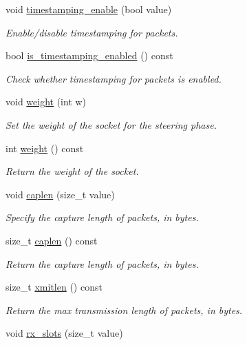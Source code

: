 \begin{DoxyCompactItemize}
void \hyperlink{classpfq_1_1socket_a39457556d11f22b1266abc8f9f7c46bd}{timestamping\+\_\+enable} (bool value)
\begin{DoxyCompactList}\small\item\em Enable/disable timestamping for packets. \end{DoxyCompactList}\item 
bool \hyperlink{classpfq_1_1socket_acb406c77d80eddec6acce34b934a8309}{is\+\_\+timestamping\+\_\+enabled} () const
\begin{DoxyCompactList}\small\item\em Check whether timestamping for packets is enabled. \end{DoxyCompactList}\item 
void \hyperlink{classpfq_1_1socket_ad843f3354b92083f01be9b5055f211b8}{weight} (int w)
\begin{DoxyCompactList}\small\item\em Set the weight of the socket for the steering phase. \end{DoxyCompactList}\item 
int \hyperlink{classpfq_1_1socket_a8c596af298aaae176a64647ba04f51ff}{weight} () const
\begin{DoxyCompactList}\small\item\em Return the weight of the socket. \end{DoxyCompactList}\item 
void \hyperlink{classpfq_1_1socket_ab68dbba5ef01041b9c96758c4a9f0a6c}{caplen} (size\+\_\+t value)
\begin{DoxyCompactList}\small\item\em Specify the capture length of packets, in bytes. \end{DoxyCompactList}\item 
size\+\_\+t \hyperlink{classpfq_1_1socket_aa0052a8337748212d02fadb229d71108}{caplen} () const
\begin{DoxyCompactList}\small\item\em Return the capture length of packets, in bytes. \end{DoxyCompactList}\item 
size\+\_\+t \hyperlink{classpfq_1_1socket_a142d9760fcef01b426c3afb4005400d9}{xmitlen} () const
\begin{DoxyCompactList}\small\item\em Return the max transmission length of packets, in bytes. \end{DoxyCompactList}\item 
void \hyperlink{classpfq_1_1socket_a5cf700fc12d67b91df3d669ac4aa737a}{rx\+\_\+slots} (size\+\_\+t value)

\end{DoxyCompactItemize}
